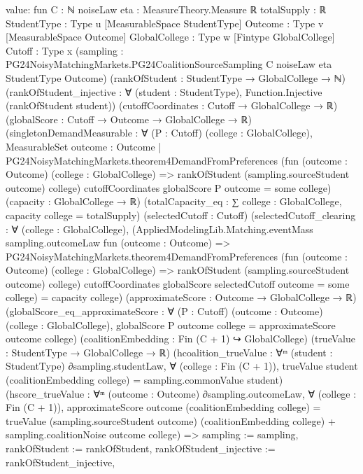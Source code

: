 \documentclass[10pt]{article}
\begin{document}
\begin{ReviewVerbatim}
value:
fun {C : ℕ} {noiseLaw eta : MeasureTheory.Measure ℝ} {totalSupply : ℝ} {StudentType : Type u}
    [MeasurableSpace StudentType] {Outcome : Type v} [MeasurableSpace Outcome] {GlobalCollege : Type w}
    [Fintype GlobalCollege] {Cutoff : Type x}
    (sampling : PG24NoisyMatchingMarkets.PG24CoalitionSourceSampling C noiseLaw eta StudentType Outcome)
    (rankOfStudent : StudentType → GlobalCollege → ℕ)
    (rankOfStudent_injective : ∀ (student : StudentType), Function.Injective (rankOfStudent student))
    (cutoffCoordinates : Cutoff → GlobalCollege → ℝ) (globalScore : Cutoff → Outcome → GlobalCollege → ℝ)
    (singletonDemandMeasurable :
      ∀ (P : Cutoff) (college : GlobalCollege),
        MeasurableSet
          {outcome : Outcome |
            PG24NoisyMatchingMarkets.theorem4DemandFromPreferences
                (fun (outcome : Outcome) (college : GlobalCollege) =>
                  rankOfStudent (sampling.sourceStudent outcome) college)
                cutoffCoordinates globalScore P outcome =
              some college})
    (capacity : GlobalCollege → ℝ) (totalCapacity_eq : ∑ college : GlobalCollege, capacity college = totalSupply)
    (selectedCutoff : Cutoff)
    (selectedCutoff_clearing :
      ∀ (college : GlobalCollege),
        (AppliedModelingLib.Matching.eventMass sampling.outcomeLaw fun (outcome : Outcome) =>
            PG24NoisyMatchingMarkets.theorem4DemandFromPreferences
                (fun (outcome : Outcome) (college : GlobalCollege) =>
                  rankOfStudent (sampling.sourceStudent outcome) college)
                cutoffCoordinates globalScore selectedCutoff outcome =
              some college) =
          capacity college)
    (approximateScore : Outcome → GlobalCollege → ℝ)
    (globalScore_eq_approximateScore :
      ∀ (P : Cutoff) (outcome : Outcome) (college : GlobalCollege),
        globalScore P outcome college = approximateScore outcome college)
    (coalitionEmbedding : Fin (C + 1) ↪ GlobalCollege) (trueValue : StudentType → GlobalCollege → ℝ)
    (hcoalition_trueValue :
      ∀ᵐ (student : StudentType) ∂sampling.studentLaw,
        ∀ (college : Fin (C + 1)), trueValue student (coalitionEmbedding college) = sampling.commonValue student)
    (hscore_trueValue :
      ∀ᵐ (outcome : Outcome) ∂sampling.outcomeLaw,
        ∀ (college : Fin (C + 1)),
          approximateScore outcome (coalitionEmbedding college) =
            trueValue (sampling.sourceStudent outcome) (coalitionEmbedding college) +
              sampling.coalitionNoise outcome college) =>
  { sampling := sampling, rankOfStudent := rankOfStudent, rankOfStudent_injective := rankOfStudent_injective,
}
\end{ReviewVerbatim}
\end{document}
